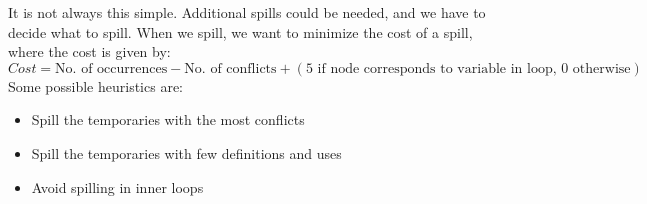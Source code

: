 \documentclass[12pt,letterpaper]{book}
\theoremstyle{definition}
\begin{document}
It is not always this simple. Additional spills could be needed, and we have to decide what to spill. When we spill, we want to minimize the cost of a spill, where the cost is given by:
\[Cost = \text{No. of occurrences} - \text{No. of conflicts} + (\text{5 if node corresponds to variable in loop, 0 otherwise})\]
Some possible heuristics are:
\begin{itemize}
  \item Spill the temporaries with the most conflicts
  \item Spill the temporaries with few definitions and uses
  \item Avoid spilling in inner loops
\end{itemize}
\end{document}
